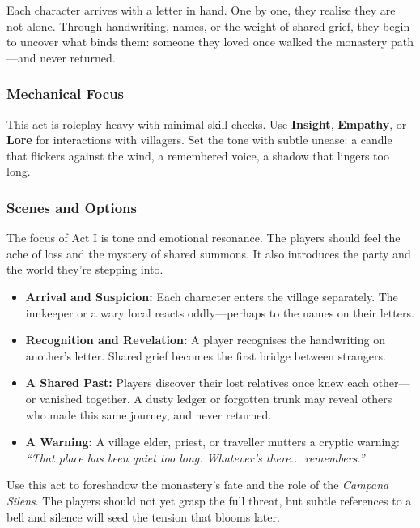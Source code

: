 \documentclass[twocolumn,nodeprecatedcode,bg=print]{dndbook/dndbook}
\begin{document}
Each character arrives with a letter in hand. One by one, they realise they are not alone. Through handwriting, names, or the weight of shared grief, they begin to uncover what binds them: someone they loved once walked the monastery path—and never returned.

\subsubsection{Mechanical Focus}
This act is roleplay-heavy with minimal skill checks. Use \textbf{Insight}, \textbf{Empathy}, or \textbf{Lore} for interactions with villagers. Set the tone with subtle unease: a candle that flickers against the wind, a remembered voice, a shadow that lingers too long.

\subsubsection{Scenes and Options}

The focus of Act I is tone and emotional resonance. The players should feel the ache of loss and the mystery of shared summons. It also introduces the party and the world they’re stepping into.

\begin{WyrdExample}
\begin{itemize}
    \item \textbf{Arrival and Suspicion:} Each character enters the village separately. The innkeeper or a wary local reacts oddly—perhaps to the names on their letters.
    
    \item \textbf{Recognition and Revelation:} A player recognises the handwriting on another’s letter. Shared grief becomes the first bridge between strangers.

    \item \textbf{A Shared Past:} Players discover their lost relatives once knew each other—or vanished together. A dusty ledger or forgotten trunk may reveal others who made this same journey, and never returned.

    \item \textbf{A Warning:} A village elder, priest, or traveller mutters a cryptic warning: \emph{“That place has been quiet too long. Whatever’s there... remembers.”}
\end{itemize}
\end{WyrdExample}

Use this act to foreshadow the monastery’s fate and the role of the \emph{Campana Silens}. The players should not yet grasp the full threat, but subtle references to a bell and silence will seed the tension that blooms later.
\end{document}
